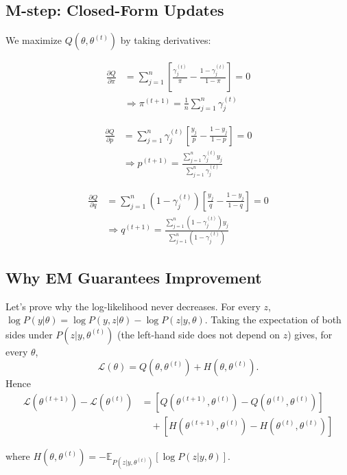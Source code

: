 \begin{notechapter}
\subsection{M-step: Closed-Form Updates}

We maximize $Q(\theta, \theta^{(t)})$ by taking derivatives:

\begin{align*}
\frac{\partial Q}{\partial \pi} &= \sum_{j=1}^n \left[\frac{\gamma_j^{(t)}}{\pi} - \frac{1-\gamma_j^{(t)}}{1-\pi}\right] = 0 \\
&\Rightarrow \pi^{(t+1)} = \frac{1}{n} \sum_{j=1}^n \gamma_j^{(t)}
\end{align*}

\begin{align*}
\frac{\partial Q}{\partial p} &= \sum_{j=1}^n \gamma_j^{(t)} \left[\frac{y_j}{p} - \frac{1-y_j}{1-p}\right] = 0 \\
&\Rightarrow p^{(t+1)} = \frac{\sum_{j=1}^n \gamma_j^{(t)} y_j}{\sum_{j=1}^n \gamma_j^{(t)}}
\end{align*}

\begin{align*}
\frac{\partial Q}{\partial q} &= \sum_{j=1}^n (1-\gamma_j^{(t)}) \left[\frac{y_j}{q} - \frac{1-y_j}{1-q}\right] = 0 \\
&\Rightarrow q^{(t+1)} = \frac{\sum_{j=1}^n (1-\gamma_j^{(t)}) y_j}{\sum_{j=1}^n (1-\gamma_j^{(t)})}
\end{align*}

\subsection{Why EM Guarantees Improvement}

Let's prove why the log-likelihood never decreases. For every $z$,
$\log P(y|\theta) = \log P(y,z|\theta) - \log P(z|y,\theta)$. Taking the expectation of both sides
under $P(z|y,\theta^{(t)})$ (the left-hand side does not depend on $z$) gives, for every $\theta$,
\[
\mathcal{L}(\theta) = Q(\theta, \theta^{(t)}) + H(\theta, \theta^{(t)}).
\]
Hence
\begin{align*}
\mathcal{L}(\theta^{(t+1)}) - \mathcal{L}(\theta^{(t)})
&= [Q(\theta^{(t+1)}, \theta^{(t)}) - Q(\theta^{(t)}, \theta^{(t)})] \\
&\quad + [H(\theta^{(t+1)}, \theta^{(t)}) - H(\theta^{(t)}, \theta^{(t)})]
\end{align*}

where $H(\theta, \theta^{(t)}) = -\mathbb{E}_{P(z|y,\theta^{(t)})}[\log P(z|y,\theta)]$.


\end{notechapter}
